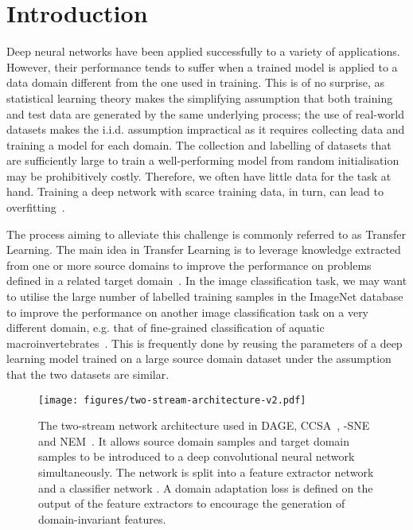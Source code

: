 \documentclass[journal]{IEEEtran}
\begin{document}
 





\maketitle


\section{Introduction} \label{sec:introduction}

Deep neural networks have been applied successfully to a variety of applications. However, their performance tends to suffer when a trained model is applied to a data domain different from the one used in training. This is of no surprise, as statistical learning theory makes the simplifying assumption that both training and test data are generated by the same underlying process; the use of real-world datasets makes the i.i.d. assumption impractical as it requires collecting data and training a model for each domain. The collection and labelling of datasets that are sufficiently large to train a well-performing model from random initialisation may be prohibitively costly. Therefore, we often have little data for the task at hand. Training a deep network with scarce training data, in turn, can lead to overfitting~\cite{arpit2017closer}. 

The process aiming to alleviate this challenge is commonly referred to as Transfer Learning. The main idea in Transfer Learning is to leverage knowledge extracted from one or more source domains to improve the performance on problems defined in a related target domain~\cite{pan2010survey, weiss2016survey, torrey2010transfer}. In the image classification task, we may want to utilise the large number of labelled training samples in the ImageNet database to improve the performance on another image classification task on a very different domain, e.g. that of fine-grained classification of aquatic macroinvertebrates~\cite{raitoharju2016data}. This is frequently done by reusing the parameters of a deep learning model trained on a large source domain dataset under the assumption that the two datasets are similar. 

\begin{figure}[!t]
    \centering
    \texttt{[image: figures/two-stream-architecture-v2.pdf]}
    \caption{The two-stream network architecture used in DAGE, CCSA~\cite{motiian2017ccsa}, -SNE~\cite{xu2019dsne} and NEM~\cite{wang2019nem}. It allows source domain samples  and target domain samples  to be introduced to a deep convolutional neural network simultaneously. The network is split into a feature extractor network  and a classifier network . A domain adaptation loss  is defined on the output of the feature extractors to encourage the generation of domain-invariant features.
    }
    \label{fig:two-stream-architecture}
\end{figure}
\end{document}
